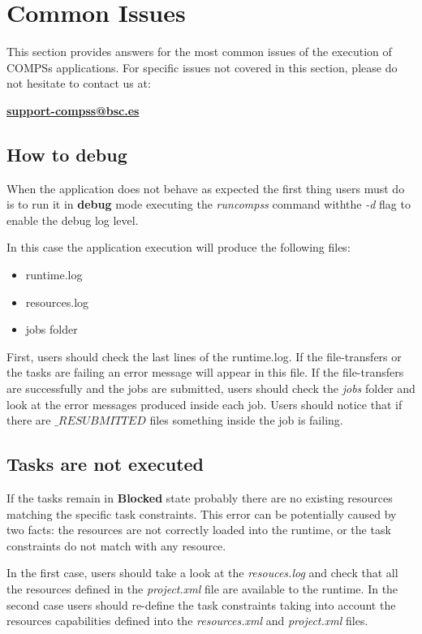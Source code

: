 \section{Common Issues}
\label{sec:Common_Issues}

This section provides answers for the most common issues of the execution of COMPSs applications.
For specific issues not covered in this section, please do not hesitate to contact us at:
\begin{center}
  \textbf{\url{support-compss@bsc.es}}
\end{center}

\subsection{How to debug}
When the application does not behave as expected the first thing users must do is to run it in \textbf{debug} mode executing the \textit{runcompss} command withthe \textit{-d} flag to enable the debug log level.

In this case the application execution will produce the following files:
\begin{itemize}
 \item runtime.log
 \item resources.log
 \item jobs folder
\end{itemize}

First, users should check the last lines of the runtime.log. If the file-transfers or the tasks are failing an error message 
will appear in this file. If the file-transfers are successfully and the jobs are submitted, users should check the \textit{jobs} folder and look 
at the error messages produced inside each job. Users should notice that if there are $\_RESUBMITTED$ files something 
inside the job is failing.

\subsection{Tasks are not executed}
If the tasks remain in \textbf{Blocked} state probably there are no existing resources matching the specific task constraints. 
This error can be potentially caused by two facts: the resources are not correctly loaded into the runtime, or the task constraints do not match with any resource. 

In the first case, users should take a look at the \textit{resouces.log} and check that all the resources
defined in the \textit{project.xml} file are available to the runtime. In the second case users should re-define the task 
constraints taking into account the resources capabilities defined into the \textit{resources.xml} and \textit{project.xml} files.

